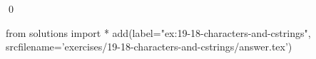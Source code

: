 
\begin{ex}
  \label{ex:19-18-characters-and-cstrings}
  
  \qed
\end{ex}
\begin{python0}
from solutions import *
add(label="ex:19-18-characters-and-cstrings",
    srcfilename='exercises/19-18-characters-and-cstrings/answer.tex')
\end{python0}
